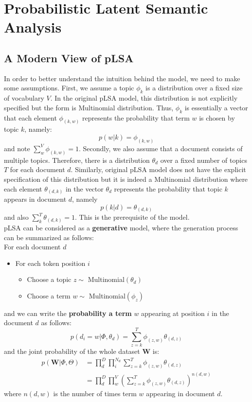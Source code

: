 \documentclass[a3paper, 12pt]{book} %
\begin{document}
\section{Probabilistic Latent Semantic Analysis}
\subsection{A Modern View of pLSA}
In order to better understand the intuition behind the model, we need to make some assumptions. First, we assume a topic $\phi_k$ is a distribution over a fixed size of vocabulary $V$. In the original pLSA model, this distribution is not explicitly specified but the form is Multinomial distribution. Thus, $\phi_k$ is essentially a vector that each element $\phi_{(k,w)}$ represents the probability that term $w$ is chosen by topic $k$, namely:
$$p(w|k)=\phi_{(k,w)}$$
and note $\sum_{w}^{V}\phi_{(k,w)}=1$. Secondly, we also assume that a document consists of multiple topics. Therefore, there is a distribution $\theta_{d}$ over a fixed number of topics $T$ for each document $d$. Similarly, original pLSA model does not have the explicit specification of this distribution but it is indeed a Multinomial distribution where each element $\theta_{(d,k)}$ in the vector $\theta_{d}$ represents the probability that topic $k$ appears in document $d$, namely
$$p(k|d)=\theta_{(d,k)}$$
and also $\sum_{k}^{T}\theta_{(d,k)}=1$. This is the prerequisite of the model. \\

pLSA can be considered as a \textbf{generative} model, where the generation process can be summarized as follows: \\

For each document $d$
\begin{itemize}
	\item For each token position $i$
	\begin{itemize}
		\item Choose a topic $z \sim $ Multinomial$(\theta_d)$
		\item Choose a term $w \sim $ Multinomial$(\phi_z)$
	\end{itemize}
\end{itemize}
and we can write the \textbf{probability a term} $w$ appearing at position $i$ in the document $d$ as follows:
\begin{equation}
	p(d_i=w|\Phi ,\theta_{d})=\sum_{z=k}^{T}{\phi_{(z,w)}\theta_{(d,z)}}
\end{equation}
and the joint probability of the whole dataset $\mathbf{W}$ is:
\begin{equation}
\begin{split} p(\mathbf{W}|\Phi,\Theta) & = \prod_d^D{\prod_i^{N_d}{\sum_{z=k}^T{\phi_{(z,w)}\theta_{(d,z)}}}} \\
& = \prod_d^D{\prod_w^{V}{(\sum_{z=k}^T{\phi_{(z,w)}\theta_{(d,z)}})^{n{(d,w)}}}} \end{split} \end{equation}
where $n(d,w)$ is the number of times term $w$ appearing in document $d$.
\end{document}
